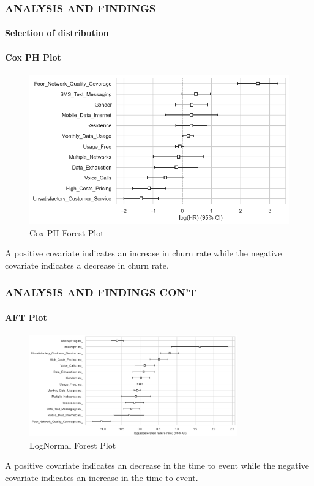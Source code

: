 \documentclass[12pt]{beamer}
\begin{document}
	
	\begin{frame}
		\frametitle{ANALYSIS AND FINDINGS}
        \framesubtitle{Selection of distribution}
      \framesubtitle{Cox PH Plot}  

		\begin{figure}[H]
			\centering
			\begin{minipage}{0.8\textwidth}
				\centering
				\includegraphics[width=\textwidth]{Figure 4/4.2.png}
				\caption{Cox PH Forest Plot}
				\label{Figure 3}
			\end{minipage}
		
		\end{figure}
A positive covariate indicates an increase in churn rate while the negative covariate indicates a decrease in churn rate.
 \end{frame}
 
	\begin{frame}
		\frametitle{ANALYSIS AND FINDINGS CON'T}
      \framesubtitle{AFT Plot}  

		\begin{figure}[H]
			\centering
			\begin{minipage}{0.8\textwidth}
				\centering
				\includegraphics[width=0.8\textwidth]{Figure 4/4.4.png}
				\caption{LogNormal Forest Plot}
				\label{Figure 4}
				
			\end{minipage}
        \end{figure}
A positive covariate indicates an decrease in the time to event while the negative covariate indicates an increase in the time to event.	
 \end{frame}
  
\end{document}
